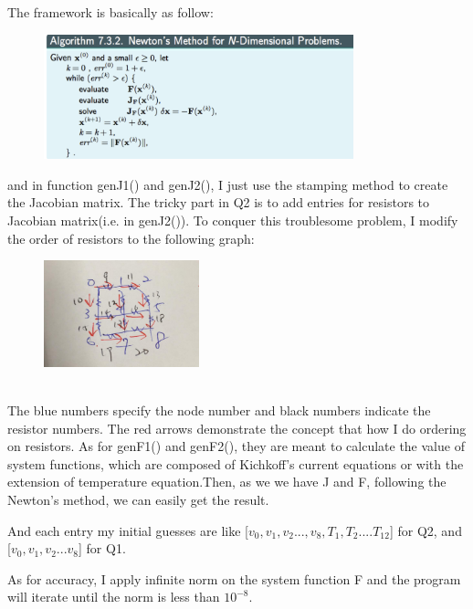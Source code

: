 \documentclass[12pt,a4paper]{article}
\begin{document}
The framework is basically as follow: 

\begin{figure}[h!]
  \centering
     \includegraphics[width=0.8\textwidth]{./framework.png}
\end{figure}

and in function genJ1() and genJ2(), I just use the stamping method to create the Jacobian matrix. The tricky part in Q2 is to add entries for resistors to Jacobian matrix(i.e. in genJ2()).
To conquer this troublesome problem, I modify the order of resistors to the following graph:
\begin{figure}[h!]
  \centering
     \includegraphics[width=0.4\textwidth]{./newnetwork.jpg}
\end{figure}
\\The blue numbers specify the node number and black numbers indicate the resistor numbers. The red arrows demonstrate the concept that how I do ordering on resistors. As for genF1() and genF2(),  they are meant to calculate the value of system functions, which are composed of Kichkoff's current equations or with the extension of temperature equation.Then, as we we have J and F, following the Newton's method, we can easily get the result.

And each entry my initial guesses are like [$v_0,v_1,v_2...,v_8,T_1,T_2....T_{12}$] for Q2, and [$v_0,v_1,v_2...v_8$] for Q1.

As for accuracy, I apply infinite norm on the system function F and the program will iterate until the norm is less than $10^{-8}$. 
\end{document}
